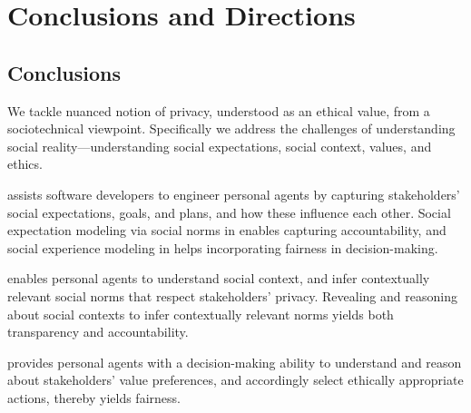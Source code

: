 \chapter{Conclusions and Directions}
\label{chap:conclusions}

\section{Conclusions}

We tackle nuanced notion of privacy, understood as an ethical value, from a sociotechnical viewpoint. 
Specifically we address the challenges of understanding social reality---understanding social expectations, social context, values, and ethics.

\frameworkA assists software developers to engineer personal agents by capturing stakeholders' social expectations, goals, and plans, and how these influence each other.  
Social expectation modeling via social norms in \frameworkA enables capturing accountability,
and social experience modeling in \frameworkA helps incorporating fairness in decision-making.

\frameworkB enables personal agents to understand social context, and infer contextually relevant social norms that respect stakeholders' privacy. 
Revealing and reasoning about social contexts to infer contextually relevant norms yields both transparency and accountability.

\frameworkAinur provides personal agents with a decision-making ability to understand and reason about stakeholders' value preferences, 
and accordingly select ethically appropriate actions, thereby yields fairness.  


